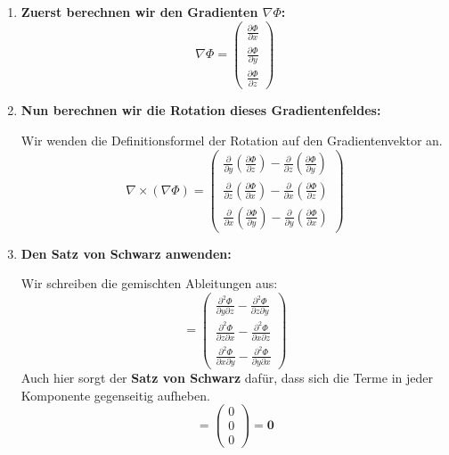 \begin{enumerate}
    \item \textbf{Zuerst berechnen wir den Gradienten $\nabla\Phi$:}
    $$
    \nabla \Phi =
    \begin{pmatrix}
        \frac{\partial \Phi}{\partial x} \\
        \frac{\partial \Phi}{\partial y} \\
        \frac{\partial \Phi}{\partial z}
    \end{pmatrix}
    $$

    \item \textbf{Nun berechnen wir die Rotation dieses Gradientenfeldes:}
    
    Wir wenden die Definitionsformel der Rotation auf den Gradientenvektor an.
    $$
    \nabla \times (\nabla \Phi) =
    \begin{pmatrix}
        \frac{\partial}{\partial y}\left(\frac{\partial \Phi}{\partial z}\right) - \frac{\partial}{\partial z}\left(\frac{\partial \Phi}{\partial y}\right) \\
        \frac{\partial}{\partial z}\left(\frac{\partial \Phi}{\partial x}\right) - \frac{\partial}{\partial x}\left(\frac{\partial \Phi}{\partial z}\right) \\
        \frac{\partial}{\partial x}\left(\frac{\partial \Phi}{\partial y}\right) - \frac{\partial}{\partial y}\left(\frac{\partial \Phi}{\partial x}\right)
    \end{pmatrix}
    $$

    \item \textbf{Den Satz von Schwarz anwenden:}
    
    Wir schreiben die gemischten Ableitungen aus:
    $$
    =
    \begin{pmatrix}
        \frac{\partial^2 \Phi}{\partial y \partial z} - \frac{\partial^2 \Phi}{\partial z \partial y} \\
        \frac{\partial^2 \Phi}{\partial z \partial x} - \frac{\partial^2 \Phi}{\partial x \partial z} \\
        \frac{\partial^2 \Phi}{\partial x \partial y} - \frac{\partial^2 \Phi}{\partial y \partial x}
    \end{pmatrix}
    $$
    Auch hier sorgt der \textbf{Satz von Schwarz} dafür, dass sich die Terme in jeder Komponente gegenseitig aufheben.
    $$
    =
    \begin{pmatrix}
        0 \\
        0 \\
        0
    \end{pmatrix} = \mathbf{0}
    $$
\end{enumerate}

